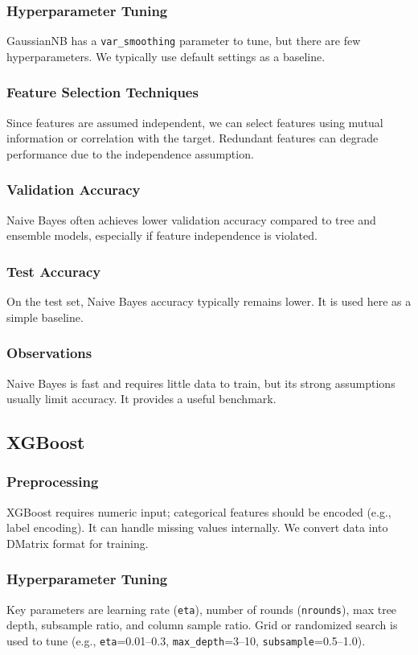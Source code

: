 \documentclass[12pt]{article}
\begin{document}
\subsubsection{Hyperparameter Tuning}
GaussianNB has a \texttt{var\_smoothing} parameter to tune, but there are few hyperparameters. We typically use default settings as a baseline.
\subsubsection{Feature Selection Techniques}
Since features are assumed independent, we can select features using mutual information or correlation with the target. Redundant features can degrade performance due to the independence assumption.
\subsubsection{Validation Accuracy}
Naive Bayes often achieves lower validation accuracy compared to tree and ensemble models, especially if feature independence is violated.
\subsubsection{Test Accuracy}
On the test set, Naive Bayes accuracy typically remains lower. It is used here as a simple baseline.
\subsubsection{Observations}
Naive Bayes is fast and requires little data to train, but its strong assumptions usually limit accuracy. It provides a useful benchmark.

\subsection{XGBoost}
\subsubsection{Preprocessing}
XGBoost requires numeric input; categorical features should be encoded (e.g., label encoding). It can handle missing values internally. We convert data into DMatrix format for training.
\subsubsection{Hyperparameter Tuning}
Key parameters are learning rate (\texttt{eta}), number of rounds (\texttt{nrounds}), max tree depth, subsample ratio, and column sample ratio. Grid or randomized search is used to tune (e.g., \texttt{eta}=0.01--0.3, \texttt{max\_depth}=3--10, \texttt{subsample}=0.5--1.0).
\end{document}
